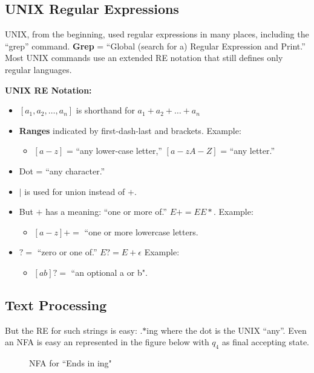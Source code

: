 \documentclass{report}
\begin{document}
\subsection{UNIX Regular Expressions}
UNIX, from the beginning, used regular expressions in many places, including the “grep” command. \textbf{Grep} = “Global (search for a) Regular Expression and Print.” Most UNIX commands use an extended RE notation that still defines only regular languages.
\par \textbf{UNIX RE Notation:}
\begin{itemize}
    \item $[a_1, a_2, \ldots, a_n]$ is shorthand for $a_1+a_2+\ldots+a_n$
    \item \textbf{Ranges} indicated by first-dash-last and brackets. Example:
        \begin{itemize}
            \item $[a-z]$ = “any lower-case letter,” $[a-z A-Z]$ = “any letter.”
        \end{itemize}
    \item Dot = “any character.”
    \item $|$ is used for union instead of $+$.
    \item But $+$ has a meaning: “one or more of.” $E+ = EE*$. Example:
        \begin{itemize}
            \item  $[a-z]+ =$ “one or more lowercase letters.
        \end{itemize}
    \item $?=$ “zero or one of.” $E? = E + \epsilon$ Example: 
    \begin{itemize}
        \item $[ab]? =$ “an optional a or b".
    \end{itemize}
\end{itemize}
\subsection{Text Processing}
But the RE for such strings is easy: .$*$ing where the dot is the UNIX “any”. Even an NFA is easy an represented in the figure below with $q_4$ as final accepting state. 
\begin{figure}[ht] 
    \centering 
    \caption{NFA for “Ends in ing"}
    \label{fig:my_label}
    \end{figure}
\end{document}
